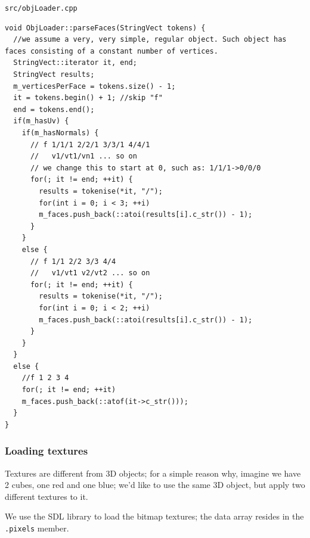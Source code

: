 \documentclass{scrartcl}
\begin{document}
\lstinline{src/objLoader.cpp}
\begin{lstlisting}
void ObjLoader::parseFaces(StringVect tokens) {
  //we assume a very, very simple, regular object. Such object has faces consisting of a constant number of vertices.
  StringVect::iterator it, end;
  StringVect results;
  m_verticesPerFace = tokens.size() - 1;
  it = tokens.begin() + 1; //skip "f"
  end = tokens.end();
  if(m_hasUv) {
    if(m_hasNormals) {
      // f 1/1/1 2/2/1 3/3/1 4/4/1
      //   v1/vt1/vn1 ... so on
      // we change this to start at 0, such as: 1/1/1->0/0/0
      for(; it != end; ++it) {
        results = tokenise(*it, "/");
        for(int i = 0; i < 3; ++i)
        m_faces.push_back(::atoi(results[i].c_str()) - 1);
      }
    }
    else {
      // f 1/1 2/2 3/3 4/4
      //   v1/vt1 v2/vt2 ... so on
      for(; it != end; ++it) {
        results = tokenise(*it, "/");
        for(int i = 0; i < 2; ++i)
        m_faces.push_back(::atoi(results[i].c_str()) - 1);
      }
    }
  }
  else {
    //f 1 2 3 4
    for(; it != end; ++it)
    m_faces.push_back(::atof(it->c_str()));
  }
}
\end{lstlisting}

\subsubsection{Loading textures}

Textures are different from 3D objects; for a simple reason why, imagine we have 2 cubes, one red and one blue; we'd like to use the same 3D object, but apply two different textures to it.

We use the SDL library to load the bitmap textures; the data array resides in the \lstinline{.pixels} member.
\end{document}
